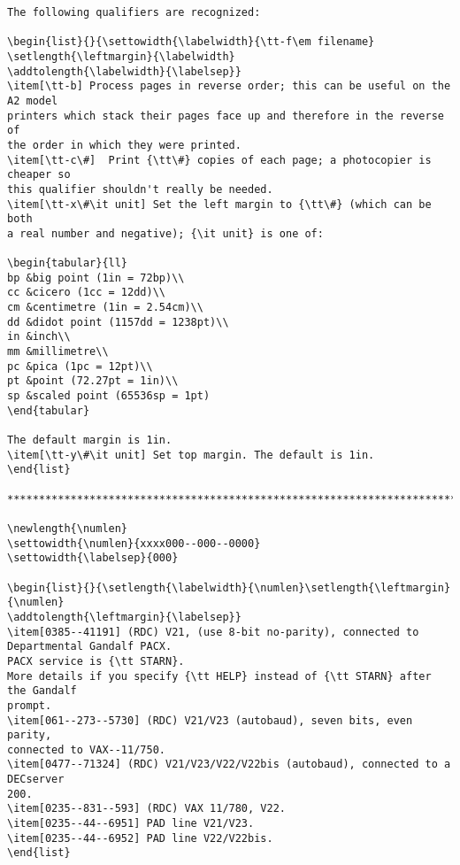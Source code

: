 \begin{verbatim}
The following qualifiers are recognized:

\begin{list}{}{\settowidth{\labelwidth}{\tt-f\em filename}
\setlength{\leftmargin}{\labelwidth}
\addtolength{\labelwidth}{\labelsep}}
\item[\tt-b] Process pages in reverse order; this can be useful on the A2 model
printers which stack their pages face up and therefore in the reverse of
the order in which they were printed.
\item[\tt-c\#]  Print {\tt\#} copies of each page; a photocopier is cheaper so
this qualifier shouldn't really be needed.
\item[\tt-x\#\it unit] Set the left margin to {\tt\#} (which can be both
a real number and negative); {\it unit} is one of:

\begin{tabular}{ll}
bp &big point (1in = 72bp)\\
cc &cicero (1cc = 12dd)\\
cm &centimetre (1in = 2.54cm)\\
dd &didot point (1157dd = 1238pt)\\
in &inch\\
mm &millimetre\\
pc &pica (1pc = 12pt)\\
pt &point (72.27pt = 1in)\\
sp &scaled point (65536sp = 1pt)
\end{tabular}

The default margin is 1in.
\item[\tt-y\#\it unit] Set top margin. The default is 1in.
\end{list}

********************************************************************************

\newlength{\numlen}
\settowidth{\numlen}{xxxx000--000--0000}
\settowidth{\labelsep}{000}

\begin{list}{}{\setlength{\labelwidth}{\numlen}\setlength{\leftmargin}{\numlen}
\addtolength{\leftmargin}{\labelsep}}
\item[0385--41191] (RDC) V21, (use 8-bit no-parity), connected to
Departmental Gandalf PACX.
PACX service is {\tt STARN}.
More details if you specify {\tt HELP} instead of {\tt STARN} after the Gandalf
prompt.
\item[061--273--5730] (RDC) V21/V23 (autobaud), seven bits, even parity,
connected to VAX--11/750.
\item[0477--71324] (RDC) V21/V23/V22/V22bis (autobaud), connected to a DECserver
200.
\item[0235--831--593] (RDC) VAX 11/780, V22.
\item[0235--44--6951] PAD line V21/V23.
\item[0235--44--6952] PAD line V22/V22bis.
\end{list}
\end{verbatim}

